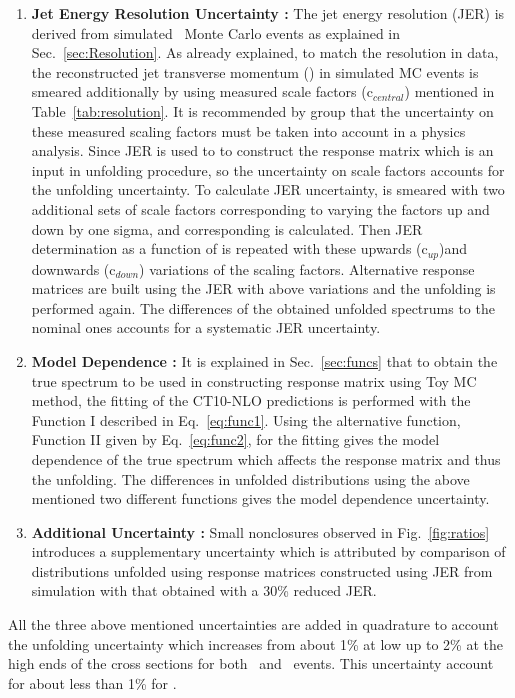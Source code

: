\begin{enumerate}
\item {\bf Jet Energy Resolution Uncertainty :} The jet energy resolution (JER) is derived from simulated \MGP~Monte Carlo events as explained in Sec.~\ref{sec:Resolution}. As already explained, to match the resolution in data, the reconstructed jet transverse momentum (\ptn) in simulated MC events is smeared additionally by using measured scale factors (c$_{central}$) mentioned in Table~\ref{tab:resolution}. It is recommended by \JetMet group that the uncertainty on these measured scaling factors must be taken into account in a physics analysis. Since JER is used to to construct the response matrix which is an input in unfolding procedure, so the uncertainty on scale factors accounts for the unfolding uncertainty. To calculate JER uncertainty, \pt is smeared with two additional sets of scale factors corresponding to varying the factors up and down by one sigma, and corresponding \httwo is calculated. Then JER determination as a function of \httwo is repeated with these upwards (c$_{up}$)and downwards (c$_{down}$) variations of the scaling factors. Alternative response matrices are built using the JER with above variations and the unfolding is performed again. The differences of the obtained unfolded spectrums to the nominal ones accounts for a systematic JER uncertainty. 

\item {\bf Model Dependence :} It is explained in Sec.~\ref{sec:funcs} that to obtain the true \httwo spectrum to be used in constructing response matrix using Toy MC method, the fitting of the CT10-NLO predictions is performed with the Function I described in Eq.~\ref{eq:func1}. Using the alternative function, Function II given by Eq.~\ref{eq:func2}, for the fitting gives the model dependence of the true \httwo spectrum which affects the response matrix and thus the unfolding. The differences in unfolded distributions using the above mentioned two different functions gives the model dependence uncertainty.

\item {\bf Additional Uncertainty :} Small nonclosures observed in Fig.~\ref{fig:ratios} introduces a supplementary uncertainty which is attributed by comparison of distributions unfolded using response matrices constructed using JER from simulation with that obtained with a 30\% reduced JER. 
\end{enumerate}

All the three above mentioned uncertainties are added in quadrature to account the unfolding uncertainty which increases from about 1\% at low \httwo up to 2\% at the high \httwo ends of the cross sections for both \njt~and \njth~events. This uncertainty account for about less than 1\% for \ratio.

